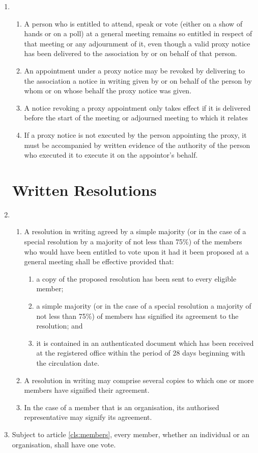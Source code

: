 \begin{enumerate}
\item
    \begin{enumerate}
        \item
        A person who is entitled to attend, speak or vote
        (either on a show of hands or on a poll) at a general meeting
        remains so entitled in respect of that meeting or any adjournment
        of it, even though a valid proxy notice has been delivered to the
        association by or on behalf of that person.
        \item
        An appointment under a
        proxy notice may be revoked by delivering to the association a notice
        in writing given by or on behalf of the person by whom or on whose
        behalf the proxy notice was given. 
        \item
        A notice revoking a proxy
        appointment only takes effect if it is delivered before the start
        of the meeting or adjourned meeting to which it relates 
        \item
        If a
        proxy notice is not executed by the person appointing the proxy, it
        must be accompanied by written evidence of the authority of the
        person who executed it to execute it on the appointor's behalf.
    \end{enumerate}

\section{Written Resolutions}

\item
  \begin{enumerate}
  \item
    A resolution in writing agreed by a simple majority (or in the case
    of a special resolution by a majority of not less than 75\%) of the
    members who would have been entitled to vote upon it had it been
    proposed at a general meeting shall be effective provided that:
    \begin{enumerate}
    \item
      a copy of the proposed resolution has been sent to every eligible
      member;
    \item
      a simple majority (or in the case of a special resolution a
      majority of not less than 75\%) of members has signified its
      agreement to the resolution; and
    \item
      it is contained in an authenticated document which has been
      received at the registered office within the period of 28 days
      beginning with the circulation date.
    \end{enumerate}
  \item
    A resolution in writing may comprise several copies to which one or
    more members have signified their agreement.
  \item
    In the case of a member that is an organisation, its authorised
    representative may signify its agreement.
  \end{enumerate}
\item
  Subject to article \ref{cls:members}, every member, whether an individual or an
  organisation, shall have one vote.


\end{enumerate}
